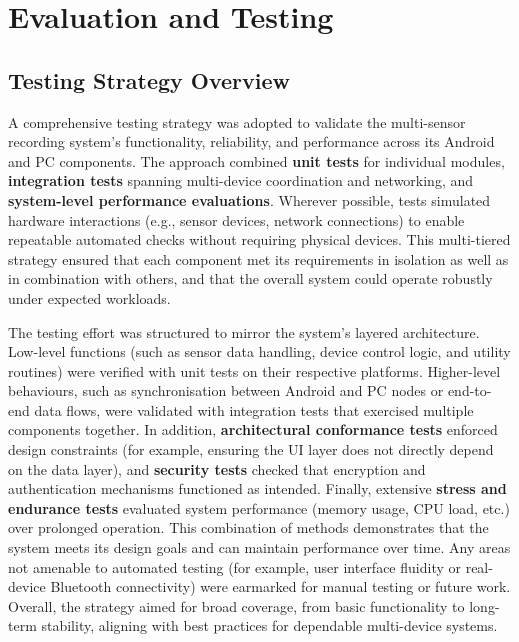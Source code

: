 \chapter{Evaluation and Testing}

\section{Testing Strategy Overview}
A comprehensive testing strategy was adopted to validate the multi-sensor recording system's functionality, reliability, and performance across its Android and PC components. The approach combined \textbf{unit tests} for individual modules, \textbf{integration tests} spanning multi-device coordination and networking, and \textbf{system-level performance evaluations}. Wherever possible, tests simulated hardware interactions (e.g., sensor devices, network connections) to enable repeatable automated checks without requiring physical devices. This multi-tiered strategy ensured that each component met its requirements in isolation as well as in combination with others, and that the overall system could operate robustly under expected workloads.

The testing effort was structured to mirror the system's layered architecture. Low-level functions (such as sensor data handling, device control logic, and utility routines) were verified with unit tests on their respective platforms. Higher-level behaviours, such as synchronisation between Android and PC nodes or end-to-end data flows, were validated with integration tests that exercised multiple components together. In addition, \textbf{architectural conformance tests} enforced design constraints (for example, ensuring the UI layer does not directly depend on the data layer), and \textbf{security tests} checked that encryption and authentication mechanisms functioned as intended. Finally, extensive \textbf{stress and endurance tests} evaluated system performance (memory usage, CPU load, etc.) over prolonged operation. This combination of methods demonstrates that the system meets its design goals and can maintain performance over time. Any areas not amenable to automated testing (for example, user interface fluidity or real-device Bluetooth connectivity) were earmarked for manual testing or future work. Overall, the strategy aimed for broad coverage, from basic functionality to long-term stability, aligning with best practices for dependable multi-device systems.


